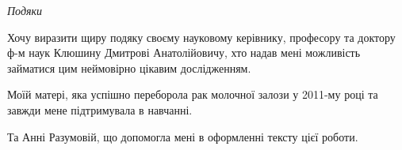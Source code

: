 \documentclass[
11pt, %
oneside, %
english, ukrainian, %
singlespacing, %
parskip, %
headsepline, %
]{MastersDoctoralThesis} %
\begin{document}
\begin{acknowledgements}

\begin{center}{\huge\textit{Подяки}\par}\end{center}

Хочу виразити щиру подяку своєму науковому керівнику, професору та доктору ф-м наук Клюшину Дмитрові Анатолійовичу, хто надав мені можливість займатися цим неймовірно цікавим дослідженням.

Моїй матері, яка успішно переборола рак молочної залози у 2011-му році та завжди мене підтримувала в навчанні.

Та Анні Разумовій, що допомогла мені в оформленні тексту цієї роботи.

\end{acknowledgements}


\tableofcontents %







\end{document}
